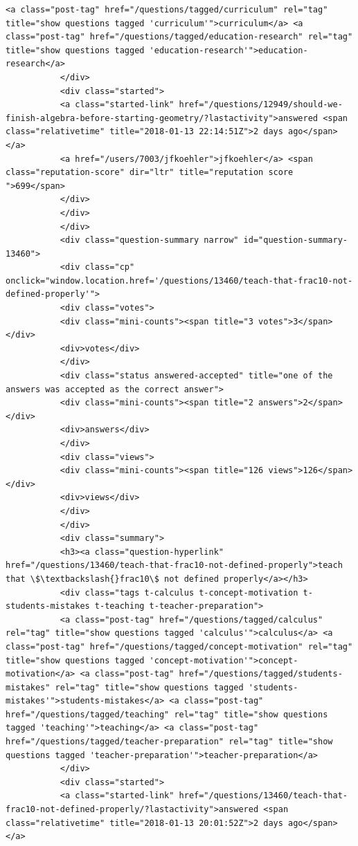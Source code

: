 \documentclass[11pt]{article}
\begin{document}
\begin{Verbatim}[commandchars=\\\{\}]
           <a class="post-tag" href="/questions/tagged/curriculum" rel="tag" title="show questions tagged 'curriculum'">curriculum</a> <a class="post-tag" href="/questions/tagged/education-research" rel="tag" title="show questions tagged 'education-research'">education-research</a>
           </div>
           <div class="started">
           <a class="started-link" href="/questions/12949/should-we-finish-algebra-before-starting-geometry/?lastactivity">answered <span class="relativetime" title="2018-01-13 22:14:51Z">2 days ago</span></a>
           <a href="/users/7003/jfkoehler">jfkoehler</a> <span class="reputation-score" dir="ltr" title="reputation score ">699</span>
           </div>
           </div>
           </div>
           <div class="question-summary narrow" id="question-summary-13460">
           <div class="cp" onclick="window.location.href='/questions/13460/teach-that-frac10-not-defined-properly'">
           <div class="votes">
           <div class="mini-counts"><span title="3 votes">3</span></div>
           <div>votes</div>
           </div>
           <div class="status answered-accepted" title="one of the answers was accepted as the correct answer">
           <div class="mini-counts"><span title="2 answers">2</span></div>
           <div>answers</div>
           </div>
           <div class="views">
           <div class="mini-counts"><span title="126 views">126</span></div>
           <div>views</div>
           </div>
           </div>
           <div class="summary">
           <h3><a class="question-hyperlink" href="/questions/13460/teach-that-frac10-not-defined-properly">teach that \$\textbackslash{}frac10\$ not defined properly</a></h3>
           <div class="tags t-calculus t-concept-motivation t-students-mistakes t-teaching t-teacher-preparation">
           <a class="post-tag" href="/questions/tagged/calculus" rel="tag" title="show questions tagged 'calculus'">calculus</a> <a class="post-tag" href="/questions/tagged/concept-motivation" rel="tag" title="show questions tagged 'concept-motivation'">concept-motivation</a> <a class="post-tag" href="/questions/tagged/students-mistakes" rel="tag" title="show questions tagged 'students-mistakes'">students-mistakes</a> <a class="post-tag" href="/questions/tagged/teaching" rel="tag" title="show questions tagged 'teaching'">teaching</a> <a class="post-tag" href="/questions/tagged/teacher-preparation" rel="tag" title="show questions tagged 'teacher-preparation'">teacher-preparation</a>
           </div>
           <div class="started">
           <a class="started-link" href="/questions/13460/teach-that-frac10-not-defined-properly/?lastactivity">answered <span class="relativetime" title="2018-01-13 20:01:52Z">2 days ago</span></a>

\end{Verbatim}
\end{document}
